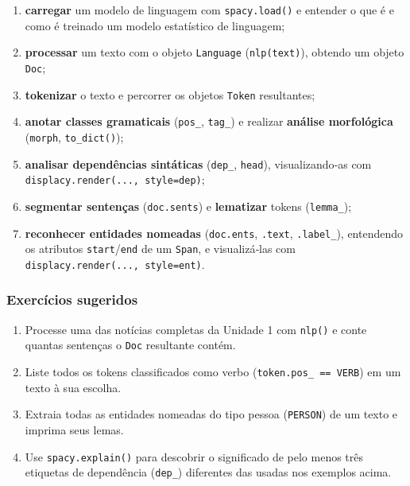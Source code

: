 \documentclass[
  brazilian,
  11pt,
]{article}
\providecommand{\tightlist}{%
  \setlength{\itemsep}{0pt}\setlength{\parskip}{0pt}}
\let\oldtexttt\texttt
\renewcommand{\texttt}[1]{{\color{inlink}\oldtexttt{#1}}}
\begin{document}
\begin{enumerate}
\def\labelenumi{\arabic{enumi}.}
\tightlist
\item
  \textbf{carregar} um modelo de linguagem com \texttt{spacy.load()} e
  entender o que é e como é treinado um modelo estatístico de linguagem;
\item
  \textbf{processar} um texto com o objeto \texttt{Language}
  (\texttt{nlp(text)}), obtendo um objeto \texttt{Doc};
\item
  \textbf{tokenizar} o texto e percorrer os objetos \texttt{Token}
  resultantes;
\item
  \textbf{anotar classes gramaticais} (\texttt{pos\_}, \texttt{tag\_}) e
  realizar \textbf{análise morfológica} (\texttt{morph},
  \texttt{to\_dict()});
\item
  \textbf{analisar dependências sintáticas} (\texttt{dep\_},
  \texttt{head}), visualizando‑as com
  \texttt{displacy.render(...,\ style=\textquotesingle{}dep\textquotesingle{})};
\item
  \textbf{segmentar sentenças} (\texttt{doc.sents}) e \textbf{lematizar}
  tokens (\texttt{lemma\_});
\item
  \textbf{reconhecer entidades nomeadas} (\texttt{doc.ents},
  \texttt{.text}, \texttt{.label\_}), entendendo os atributos
  \texttt{start}/\texttt{end} de um \texttt{Span}, e visualizá‑las com
  \texttt{displacy.render(...,\ style=\textquotesingle{}ent\textquotesingle{})}.
\end{enumerate}

\subsubsection{Exercícios sugeridos}\label{exercuxedcios-sugeridos}

\begin{enumerate}
\def\labelenumi{\arabic{enumi}.}
\tightlist
\item
  Processe uma das notícias completas da Unidade 1 com \texttt{nlp()} e
  conte quantas sentenças o \texttt{Doc} resultante contém.
\item
  Liste todos os tokens classificados como verbo
  (\texttt{token.pos\_\ ==\ \textquotesingle{}VERB\textquotesingle{}})
  em um texto à sua escolha.
\item
  Extraia todas as entidades nomeadas do tipo pessoa (\texttt{PERSON})
  de um texto e imprima seus lemas.
\item
  Use \texttt{spacy.explain()} para descobrir o significado de pelo
  menos três etiquetas de dependência (\texttt{dep\_}) diferentes das
  usadas nos exemplos acima.
\end{enumerate}
\end{document}
